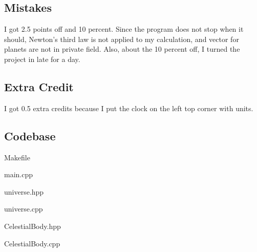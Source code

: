 \subsection{Mistakes}\label{sec:ps3b:Mistakes}

I got 2.5 points off and 10 percent. Since the program does not stop when it should, Newton's third law is not applied to my calculation, and vector for planets are not in private field. Also, about the 10 percent off, I turned the project in late for a day. 

\subsection{Extra Credit}\label{sec:ps3b:Extra Credit}

I got 0.5 extra credits because I put the clock on the left top corner with units.

\subsection{Codebase}\label{sec:ps3b:code}

Makefile

main.cpp

universe.hpp

universe.cpp

CelestialBody.hpp

CelestialBody.cpp


\newpage
